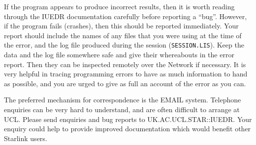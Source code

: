 If the program appears to produce incorrect results, then it is worth
reading  through the IUEDR documentation carefully before reporting a
``bug''. However, if the program fails (crashes), then this should be
reported immediately. Your report should include the names of any
files that you were using at the time of the error, and the log file
produced during the session ({\tt SESSION.LIS}). Keep the  data and
the log file  somewhere safe and give their whereabouts in the error
report. Then they can be inspected remotely over the Network if
necessary. It is very helpful in tracing programming errors to have as
much information to hand as possible, and you are urged to give as
full an account of the error as you can. 

The preferred mechanism for correspondence is the EMAIL system.
Telephone enquiries can be very hard to understand, and are often
difficult to arrange at UCL. Please send enquiries and bug reports to
UK.AC.UCL.STAR::IUEDR. Your enquiry could help to provide improved
documentation which would benefit other Starlink users.



